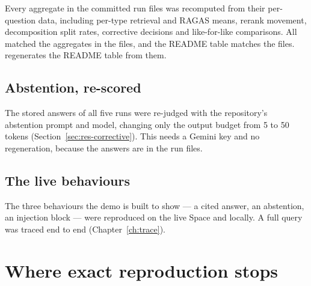 \begin{measured}
Every aggregate in the committed run files was recomputed from their per-question data, including per-type retrieval and RAGAS means, rerank movement, decomposition split rates, corrective decisions and like-for-like comparisons. All matched the aggregates in the files, and the README table matches the files.  regenerates the README table from them.
\end{measured}

\subsection{Abstention, re-scored}

\begin{measured}
The stored answers of all five runs were re-judged with the repository's abstention prompt and model, changing only the output budget from 5 to 50 tokens (Section~\ref{sec:res-corrective}). This needs a Gemini key and no regeneration, because the answers are in the run files.
\end{measured}

\subsection{The live behaviours}

\begin{measured}
The three behaviours the demo is built to show --- a cited answer, an abstention, an injection block --- were reproduced on the live Space and locally. A full  query was traced end to end (Chapter~\ref{ch:trace}).
\end{measured}

\section{Where exact reproduction stops}


